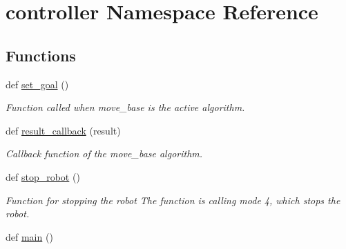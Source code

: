 \hypertarget{namespacecontroller}{}\section{controller Namespace Reference}
\label{namespacecontroller}
\subsection*{Functions}
\begin{DoxyCompactItemize}
\item 
def \hyperlink{namespacecontroller_a921b59428797e89aa059050e061014f9}{set\+\_\+goal} ()
\begin{DoxyCompactList}\small\item\em Function called when move\+\_\+base is the active algorithm. \end{DoxyCompactList}\item 
def \hyperlink{namespacecontroller_a58a7bbc614b6a885eaeb12996e134ff7}{result\+\_\+callback} (result)
\begin{DoxyCompactList}\small\item\em Callback function of the move\+\_\+base algorithm. \end{DoxyCompactList}\item 
def \hyperlink{namespacecontroller_a432e354948f911d131f99e3abbc7bc64}{stop\+\_\+robot} ()
\begin{DoxyCompactList}\small\item\em Function for stopping the robot The function is calling mode 4, which stops the robot. \end{DoxyCompactList}\item 
def \hyperlink{namespacecontroller_a8118d5e083db16a381dbecddfd6cc646}{main} ()
\end{DoxyCompactItemize}
